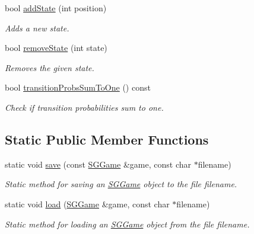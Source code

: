 \begin{DoxyCompactItemize}
bool \hyperlink{classSGGame_a0e4ea56b9e9787dca697782cbedc76d6}{add\+State} (int position)
\begin{DoxyCompactList}\small\item\em Adds a new state. \end{DoxyCompactList}\item 
\mbox{\label{classSGGame_ae4930c4311ee2f7a814400e3e50123a8}} 
bool \hyperlink{classSGGame_ae4930c4311ee2f7a814400e3e50123a8}{remove\+State} (int state)
\begin{DoxyCompactList}\small\item\em Removes the given state. \end{DoxyCompactList}\item 
\mbox{\label{classSGGame_a4bf2a75864749594145cbd2194ebadd4}} 
bool \hyperlink{classSGGame_a4bf2a75864749594145cbd2194ebadd4}{transition\+Probs\+Sum\+To\+One} () const
\begin{DoxyCompactList}\small\item\em Check if transition probabilities sum to one. \end{DoxyCompactList}\end{DoxyCompactItemize}
\subsection*{Static Public Member Functions}
\begin{DoxyCompactItemize}
\item 
\mbox{\label{classSGGame_aaccf18a3663ec99360e5b6e64f2bf6e2}} 
static void \hyperlink{classSGGame_aaccf18a3663ec99360e5b6e64f2bf6e2}{save} (const \hyperlink{classSGGame}{S\+G\+Game} \&game, const char $\ast$filename)
\begin{DoxyCompactList}\small\item\em Static method for saving an \hyperlink{classSGGame}{S\+G\+Game} object to the file filename. \end{DoxyCompactList}\item 
\mbox{\label{classSGGame_ac1dc35b84318448efc37b80afe210170}} 
static void \hyperlink{classSGGame_ac1dc35b84318448efc37b80afe210170}{load} (\hyperlink{classSGGame}{S\+G\+Game} \&game, const char $\ast$filename)
\begin{DoxyCompactList}\small\item\em Static method for loading an \hyperlink{classSGGame}{S\+G\+Game} object from the file filename. \end{DoxyCompactList}\end{DoxyCompactItemize}
